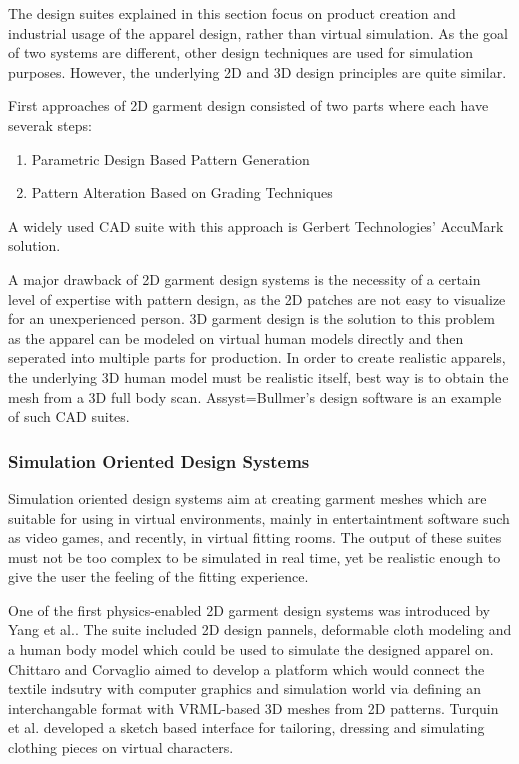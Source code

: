   The design suites explained in this section focus on product creation and industrial usage of the apparel design, rather than virtual simulation. 
  As the goal of two systems are different, other design techniques are used for simulation purposes. However, the underlying 2D and 3D design principles 
  are quite similar.
  
  First approaches of 2D garment design consisted of two parts where each have severak steps\cite{Yang2007}:  
 
 \begin{enumerate}
\item Parametric Design Based Pattern Generation
\item Pattern Alteration Based on Grading Techniques
\end{enumerate}    
 
 A widely used CAD suite with this approach is Gerbert Technologies' AccuMark solution\cite{Gerbert2013}. 
 
 A major drawback of 2D garment design systems is the necessity of a certain level of expertise with pattern design, as the 2D patches are not easy to visualize 
 for an unexperienced person. 3D garment design is the solution to this problem as the apparel can be modeled on virtual human models directly and then seperated 
 into multiple parts for production. In order to create realistic apparels, the underlying 3D human model must be realistic itself, best way is to obtain the mesh 
 from a 3D full body scan. Assyst=Bullmer's design software is an example of such CAD suites\cite{Assyst2013}. 
 
\subsubsection{Simulation Oriented Design Systems} 
 
 Simulation oriented design systems aim at creating garment meshes which are suitable for using in virtual environments, mainly in entertaintment software such 
 as video games, and recently, in virtual fitting rooms. The output of these suites must not be too complex to be simulated in real time, yet be realistic enough
 to give the user the feeling of the fitting experience.
 
 One of the first physics-enabled 2D garment design systems was introduced by Yang et al.\cite{Yang1992}. The suite included 2D design pannels, deformable cloth modeling and
 a human body model which could be used to simulate the designed apparel on. Chittaro and Corvaglio\cite{Chittaro2003} aimed to develop a platform which would connect
 the textile indsutry with computer graphics and simulation world via defining an interchangable format with VRML-based 3D meshes from 2D patterns. 
 Turquin et al. developed a sketch based interface for tailoring, dressing and simulating clothing pieces on virtual characters\cite{Turquin2007}.
 
